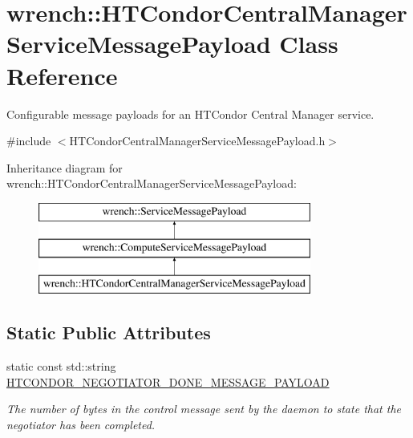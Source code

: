 \hypertarget{classwrench_1_1_h_t_condor_central_manager_service_message_payload}{}\section{wrench\+:\+:H\+T\+Condor\+Central\+Manager\+Service\+Message\+Payload Class Reference}
\label{classwrench_1_1_h_t_condor_central_manager_service_message_payload}


Configurable message payloads for an H\+T\+Condor Central Manager service.  




{\ttfamily \#include $<$H\+T\+Condor\+Central\+Manager\+Service\+Message\+Payload.\+h$>$}

Inheritance diagram for wrench\+:\+:H\+T\+Condor\+Central\+Manager\+Service\+Message\+Payload\+:\begin{figure}[H]
\begin{center}
\leavevmode
\includegraphics[height=3.000000cm]{classwrench_1_1_h_t_condor_central_manager_service_message_payload}
\end{center}
\end{figure}
\subsection*{Static Public Attributes}
\begin{DoxyCompactItemize}
\item 
\mbox{\label{classwrench_1_1_h_t_condor_central_manager_service_message_payload_a7359fb0be37a14e6afb9efa9ec2d9c38}} 
static const std\+::string \hyperlink{classwrench_1_1_h_t_condor_central_manager_service_message_payload_a7359fb0be37a14e6afb9efa9ec2d9c38}{H\+T\+C\+O\+N\+D\+O\+R\+\_\+\+N\+E\+G\+O\+T\+I\+A\+T\+O\+R\+\_\+\+D\+O\+N\+E\+\_\+\+M\+E\+S\+S\+A\+G\+E\+\_\+\+P\+A\+Y\+L\+O\+AD}
\begin{DoxyCompactList}\small\item\em The number of bytes in the control message sent by the daemon to state that the negotiator has been completed. \end{DoxyCompactList}\end{DoxyCompactItemize}


